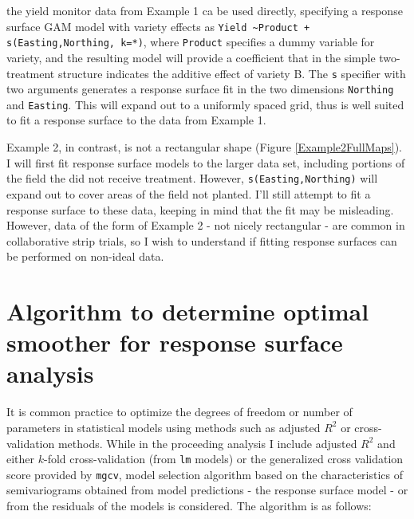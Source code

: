 \documentclass[phdcss]{SDSUThesis}
\begin{document}
the yield monitor data from Example 1 ca be used directly, specifying a response surface GAM model with variety effects as
\texttt{Yield \textasciitilde Product + s(Easting,Northing, k=*)}, where \texttt{Product} specifies a dummy variable for variety, and the resulting model will provide a coefficient that in the simple two-treatment structure indicates the additive effect of variety B. The \texttt{s} specifier with two arguments generates a response surface fit in the two dimensions \texttt{Northing} and \texttt{Easting}. This will expand out to a uniformly spaced grid, thus is well suited to fit a response surface to the data from Example 1.

Example 2, in contrast, is not a rectangular shape (Figure \ref{Example2FullMaps}). I will first fit response surface models to the larger data set, including portions of the field the did not receive treatment. However, \texttt{s(Easting,Northing)} will expand out to cover areas of the field not planted. I'll still attempt to fit a response surface to these data, keeping in mind that the fit may be misleading. However, data of the form of Example 2 - not nicely rectangular - are common in collaborative strip trials, so I wish to understand if fitting response surfaces can be performed on non-ideal data.

\clearpage

\section{Algorithm to determine optimal smoother for response surface analysis}
It is common practice to optimize the degrees of freedom or number of parameters in statistical models using methods such as adjusted $R^2$ or cross-validation methods. While in the proceeding analysis I include adjusted $R^2$ and either $k$-fold cross-validation (from \texttt{lm} models) or the generalized cross validation score provided by \texttt{mgcv}, model selection algorithm based on the characteristics of semivariograms obtained from model predictions - the response surface model - or from the residuals of the models is considered. 
The algorithm is as follows:
\end{document}
